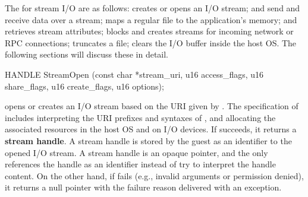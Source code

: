 The \hostapis{} for stream I/O are as follows:
 creates or opens an I/O stream;
 and 
send and receive data over a stream;
 maps %
a regular file to the application's memory; %
 and 
retrieves stream attributes;
 blocks and creates streams for incoming network or RPC connections;
 truncates a file;
 clears the I/O buffer inside the host OS.
The following sections will discuss these \hostapis{} in detail.









\begin{paldef}
HANDLE StreamOpen (const char *stream_uri,
                   u16 access_flags, u16 share_flags,
                   u16 create_flags, u16 options);
\end{paldef}



 opens or creates an I/O stream %
based on the URI given by . %
The specification of 
 includes interpreting the URI prefixes and syntaxes of ,
and allocating the associated resources in the host OS and on I/O devices.
If  succeeds, it returns a {\bf stream handle}.
A stream handle is stored by the guest as an identifier to the opened I/O stream.
A stream handle is an opaque pointer, and the \libos{} only references the handle as an identifier instead of try to interpret the handle content.
On the other hand, if  fails (e.g., invalid arguments or permission denied), it returns a null pointer with the failure reason delivered with an exception.


